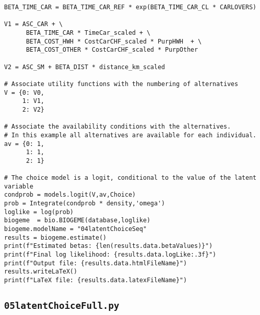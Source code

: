 \documentclass[12pt,a4paper]{article}
\begin{document}
\begin{lstlisting}[style=numbers]
BETA_TIME_CAR = BETA_TIME_CAR_REF * exp(BETA_TIME_CAR_CL * CARLOVERS)

V1 = ASC_CAR + \
      BETA_TIME_CAR * TimeCar_scaled + \
      BETA_COST_HWH * CostCarCHF_scaled * PurpHWH  + \
      BETA_COST_OTHER * CostCarCHF_scaled * PurpOther 

V2 = ASC_SM + BETA_DIST * distance_km_scaled

# Associate utility functions with the numbering of alternatives
V = {0: V0,
     1: V1,
     2: V2}

# Associate the availability conditions with the alternatives.
# In this example all alternatives are available for each individual.
av = {0: 1,
      1: 1,
      2: 1}

# The choice model is a logit, conditional to the value of the latent variable
condprob = models.logit(V,av,Choice)
prob = Integrate(condprob * density,'omega')
loglike = log(prob)
biogeme  = bio.BIOGEME(database,loglike)
biogeme.modelName = "04latentChoiceSeq"
results = biogeme.estimate()
print(f"Estimated betas: {len(results.data.betaValues)}")
print(f"Final log likelihood: {results.data.logLike:.3f}")
print(f"Output file: {results.data.htmlFileName}")
results.writeLaTeX()
print(f"LaTeX file: {results.data.latexFileName}")
\end{lstlisting}

\subsection{\lstinline$05latentChoiceFull.py$}
\label{sec:05latentChoiceFull}
\end{document}
